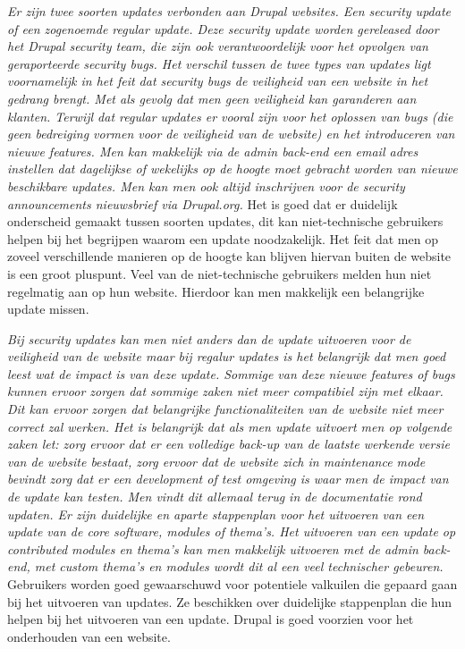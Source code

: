 \textit{Er zijn twee soorten updates verbonden aan Drupal websites. Een security update of een zogenoemde regular update. Deze security update worden gereleased door het Drupal security team, die zijn ook verantwoordelijk voor het opvolgen van geraporteerde security bugs. Het verschil tussen de twee types van updates ligt voornamelijk in het feit dat security bugs de veiligheid van een website in het gedrang brengt. Met als gevolg dat men geen veiligheid kan garanderen aan klanten. Terwijl dat regular updates er vooral zijn voor het oplossen van bugs (die geen bedreiging vormen voor de veiligheid van de website) en het introduceren van nieuwe features. Men kan makkelijk via de admin back-end een email adres instellen dat dagelijkse of wekelijks op de hoogte moet gebracht worden van nieuwe beschikbare updates. Men kan men ook altijd inschrijven voor de security announcements nieuwsbrief via Drupal.org.} \autocite{DrupalAssociation2015-2017a} Het is goed dat er duidelijk onderscheid gemaakt tussen soorten updates, dit kan niet-technische gebruikers helpen bij het begrijpen waarom een update noodzakelijk. Het feit dat men op zoveel verschillende manieren op de hoogte kan blijven hiervan buiten de website is een groot pluspunt. Veel van de niet-technische gebruikers melden hun niet regelmatig aan op hun website. Hierdoor kan men makkelijk een belangrijke update missen.

\textit{Bij security updates kan men niet anders dan de update uitvoeren voor de veiligheid van de website maar bij regalur updates is het belangrijk dat men goed leest wat de impact is van deze update. Sommige van deze nieuwe features of bugs kunnen ervoor zorgen dat sommige zaken niet meer compatibiel zijn met elkaar. Dit kan ervoor zorgen dat belangrijke functionaliteiten van de website niet meer correct zal werken. Het is belangrijk dat als men update uitvoert men op volgende zaken let: zorg ervoor dat er een volledige back-up van de laatste werkende versie van de website bestaat, zorg ervoor dat de website zich in maintenance mode bevindt zorg dat er een development of test omgeving is waar men de impact van de update kan testen. Men vindt dit allemaal terug in de documentatie rond updaten. Er zijn duidelijke en aparte stappenplan voor het uitvoeren van een update van de core software, modules of thema's. Het uitvoeren van een update op contributed modules en thema's kan men makkelijk uitvoeren met de admin back-end, met custom thema's en modules wordt dit al een veel technischer gebeuren. }\autocite{DrupalAssociation2015-2017a} Gebruikers worden goed gewaarschuwd voor potentiele valkuilen die gepaard gaan bij het uitvoeren van updates. Ze beschikken over duidelijke stappenplan die hun helpen bij het uitvoeren van een update. Drupal is goed voorzien voor het onderhouden van een website.
